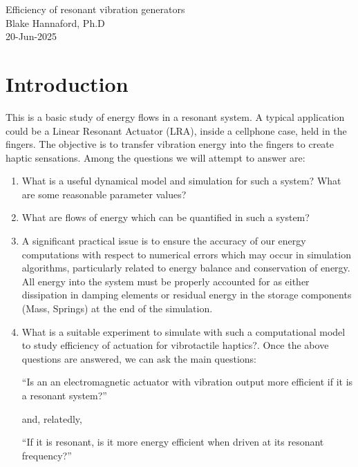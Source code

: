 \documentclass[letterpaper,11pt]{article}
\begin{document}
%
\begin{center}{\Large
Efficiency of resonant vibration generators\\
Blake Hannaford, Ph.D\\}
20-Jun-2025
\end{center}


\begin{figure}[b]\centering

\caption{}\label{3MassSchematic}
\end{figure}

\section*{Introduction}
This is a basic study of energy flows in a resonant system.  A typical application could be a Linear Resonant Actuator (LRA), inside a cellphone case,
held in the fingers.  The objective is to transfer vibration energy into the fingers to create haptic sensations.   Among the questions we will
attempt to answer are:
\begin{enumerate}
    \item  What is a useful dynamical model and simulation for such a system? What are some reasonable parameter values?
    \item  What are flows of energy which can be quantified in such a system?
    \item A significant practical issue is to ensure the accuracy of our energy computations with respect to numerical errors which may
    occur in simulation algorithms, particularly related to energy balance and conservation of energy.    All energy into the system must
    be properly accounted for as either dissipation in damping elements or residual energy in the storage components (Mass, Springs) at the end of the simulation.
    \item  What is a suitable experiment to simulate with such a computational model
    to study efficiency of
    actuation for vibrotactile haptics?.
     Once the above questions are answered, we can ask the main questions:

         ``Is an an electromagnetic
     actuator with vibration output more efficient if it is a resonant system?''

     and, relatedly,

     ``If it is resonant, is it more energy efficient when driven at its resonant frequency?''
\end{enumerate}
\end{document}
